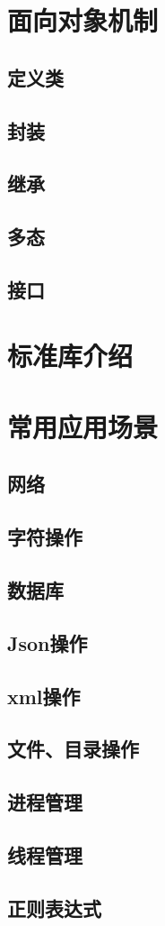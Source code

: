 \documentclass[11pt]{book}
\begin{document}
	\chapter{面向对象机制}
		\section{定义类}
		\section{封装}
		\section{继承}
		\section{多态}
		\section{接口}
	\chapter{标准库介绍}
	
	\chapter{常用应用场景}
		\section{网络}
		\section{字符操作}
		\section{数据库}
		\section{Json操作}
		\section{xml操作}
		\section{文件、目录操作}
		\section{进程管理}
		\section{线程管理}
		\section{正则表达式}
	
\end{document}
